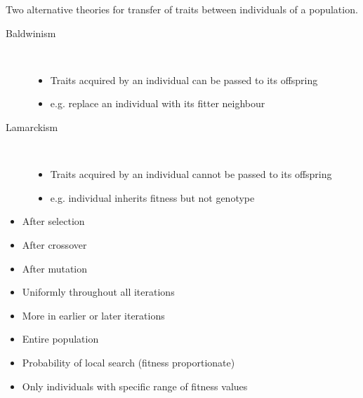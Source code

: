 \documentclass[a4paper]{article}
\begin{document}

Two alternative theories for transfer of traits between individuals of a
population.

\begin{description}
  \item[Baldwinism] \hfill \\
    \begin{itemize}
      \item Traits acquired by an individual can be passed to its offspring
      \item e.g. replace an individual with its fitter neighbour
    \end{itemize}

  \item[Lamarckism] \hfill \\
    \begin{itemize}
      \item Traits acquired by an individual cannot be passed to its offspring
      \item e.g. individual inherits fitness but not genotype
    \end{itemize}

\end{description}


\begin{itemize}
  \item After selection
  \item After crossover
  \item After mutation
\end{itemize}


\begin{itemize}
  \item Uniformly throughout all iterations
  \item More in earlier or later iterations
\end{itemize}


\begin{itemize}
  \item Entire population
  \item Probability of local search (fitness proportionate)
  \item Only individuals with specific range of fitness values
\end{itemize}
\end{document}
